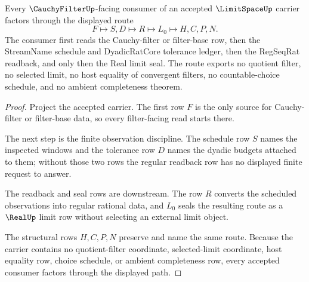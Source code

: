 \begin{theorem}
\label{thm:limit-space-cauchy-filter-consumer-route}
Every $\CauchyFilterUp$-facing consumer of an accepted $\LimitSpaceUp$ carrier factors through the displayed route
$$
F \longmapsto S,D \longmapsto R \longmapsto L_0 \longmapsto H,C,P,N .
$$
The consumer first reads the Cauchy-filter or filter-base row, then the StreamName schedule and DyadicRatCore tolerance ledger, then the RegSeqRat readback, and only then the Real limit seal. The route exports no quotient filter, no selected limit, no host equality of convergent filters, no countable-choice schedule, and no ambient completeness theorem.
\end{theorem}
\begin{proof}
Project the accepted carrier. The first row $F$ is the only source for Cauchy-filter or filter-base data, so every filter-facing read starts there.

The next step is the finite observation discipline. The schedule row $S$ names the inspected windows and the tolerance row $D$ names the dyadic budgets attached to them; without those two rows the regular readback row has no displayed finite request to answer.

The readback and seal rows are downstream. The row $R$ converts the scheduled observations into regular rational data, and $L_0$ seals the resulting route as a $\RealUp$ limit row without selecting an external limit object.

The structural rows $H,C,P,N$ preserve and name the same route. Because the carrier contains no quotient-filter coordinate, selected-limit coordinate, host equality row, choice schedule, or ambient completeness row, every accepted consumer factors through the displayed path.
\end{proof}



